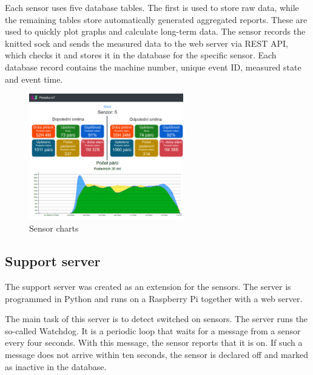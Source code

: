 \documentclass[12pt, a4paper]{article}
\begin{document}
Each sensor uses five database tables. The first is used to store raw data, while the remaining tables store automatically generated aggregated reports.
These are used to quickly plot graphs and calculate long-term data.
The sensor records the knitted sock and sends the measured data to the web server via REST API, which checks it and stores it in the database for the specific sensor.
Each database record contains the machine number, unique event ID, measured state and event time.

% 


\begin{figure}[t]
    \centering
    \includegraphics[width=0.6\textwidth]{img/prehled.png}
    \caption{Sensor charts}
    \label{fig:webSenzory}
\end{figure}


\subsection*{Support server}

The support server was created as an extension for the sensors.
The server is programmed in Python and runs on a Raspberry Pi together with a web server.\newline

The main task of this server is to detect switched on sensors.
The server runs the so-called Watchdog.
It is a periodic loop that waits for a message from a sensor every four seconds.
With this message, the sensor reports that it is on. If such a message does not arrive within ten seconds, the sensor is declared off and marked as inactive in the database.

\newpage
\end{document}
